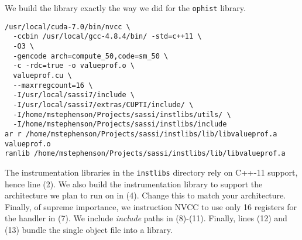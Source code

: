 We build the library exactly the way we did for the \texttt{ophist}
library.

\begin{lstlisting}[style=BashInputStyle]
/usr/local/cuda-7.0/bin/nvcc \
  -ccbin /usr/local/gcc-4.8.4/bin/ -std=c++11 \
  -O3 \
  -gencode arch=compute_50,code=sm_50 \
  -c -rdc=true -o valueprof.o \
  valueprof.cu \
  --maxrregcount=16 \
  -I/usr/local/sassi7/include \
  -I/usr/local/sassi7/extras/CUPTI/include/ \
  -I/home/mstephenson/Projects/sassi/instlibs/utils/ \
  -I/home/mstephenson/Projects/sassi/instlibs/include
ar r /home/mstephenson/Projects/sassi/instlibs/lib/libvalueprof.a valueprof.o
ranlib /home/mstephenson/Projects/sassi/instlibs/lib/libvalueprof.a
\end{lstlisting}

The instrumentation libraries in the \texttt{instlibs} directory rely on C++-11 support,
hence line (2).  We also build the instrumentation library to support
the architecture we plan to run on in (4).  Change this to match your
architecture.  Finally, of supreme importance, we instruction NVCC to
use only 16 registers for the handler in (7).  We include
\emph{include} paths in (8)-(11).  Finally, lines (12) and (13) bundle
the single object file into a library.
